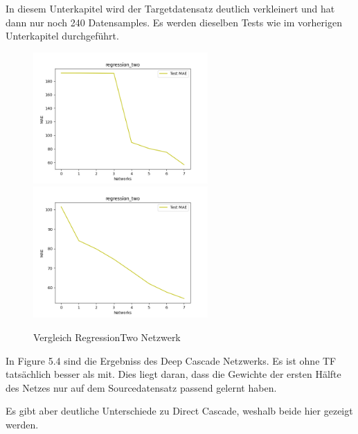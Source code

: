 In diesem Unterkapitel wird der Targetdatensatz deutlich verkleinert und hat dann nur noch 240 Datensamples. Es werden dieselben Tests wie 
im vorherigen Unterkapitel durchgeführt. 


\begin{figure}[htpb]
    \includegraphics[height=5cm]{../../Plots/ba_plots/regression_small/regr2_ts.png}
    \includegraphics[height=5cm]{../../Plots/ba_plots/regression_small/woregr2_ts.png}
    \caption{\label{fig:smallregr} Vergleich RegressionTwo Netzwerk}
\end{figure}


In Figure 5.4 sind die Ergebniss des Deep Cascade Netzwerks. Es ist ohne TF tatsächlich besser als mit. Dies liegt daran, dass die Gewichte der 
ersten Hälfte des Netzes nur auf dem Sourcedatensatz passend gelernt haben. 

Es gibt aber deutliche Unterschiede zu Direct Cascade, weshalb beide hier gezeigt werden. 

